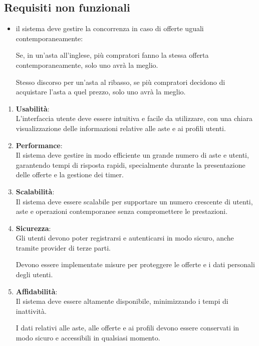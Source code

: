 \subsection{Requisiti non funzionali}
\begin{itemize}
	\item il sistema deve gestire la concorrenza in caso di offerte uguali contemporaneamente:

	      Se, in un'asta all'inglese, più compratori fanno la stessa offerta contemporaneamente, solo uno avrà la meglio.

	      Stesso discorso per un'asta al ribasso, se più compratori decidono di acquistare l'asta a quel prezzo, solo uno avrà la meglio.
\end{itemize}
\begin{enumerate}
	\item {\sffamily \textbf{Usabilità}}:\\
	      L'interfaccia utente deve essere intuitiva e facile da utilizzare, con una chiara visualizzazione delle informazioni relative alle aste e ai profili utenti.

	\item {\sffamily \textbf{Performance}}:\\
	      Il sistema deve gestire in modo efficiente un grande numero di aste e utenti, garantendo tempi di risposta rapidi, specialmente durante la presentazione delle offerte e la gestione dei timer.

	\item {\sffamily \textbf{Scalabilità}}:\\
	      Il sistema deve essere scalabile per supportare un numero crescente di utenti, aste e operazioni contemporanee senza compromettere le prestazioni.

	\item {\sffamily \textbf{Sicurezza}}:\\
	      Gli utenti devono poter registrarsi e autenticarsi in modo sicuro, anche tramite provider di terze parti.

	      Devono essere implementate misure per proteggere le offerte e i dati personali degli utenti.

	\item {\sffamily \textbf{Affidabilità}}:\\
	      Il sistema deve essere altamente disponibile, minimizzando i tempi di inattività.

	      I dati relativi alle aste, alle offerte e ai profili devono essere conservati in modo sicuro e accessibili in qualsiasi momento.
\end{enumerate}

